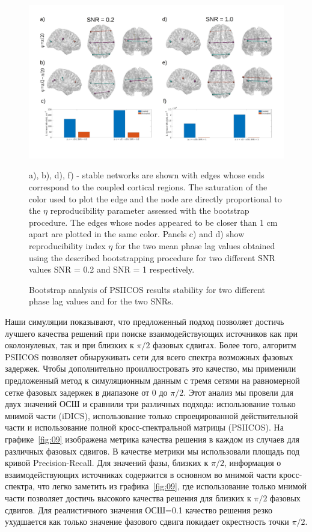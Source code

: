 \begin{figure}[!ht]
 \includegraphics[width=\textwidth]{../images/psiicos_paper/Figure8_hr.jpg}
 \caption{Bootstrap analysis of PSIICOS results stability for two different phase lag values and for the two SNRs.}
 a), b), d), f) - stable networks are shown with edges whose ends correspond to
 the coupled cortical regions. The saturation of the color used to plot the
 edge and the node are directly proportional to the $\eta$ reproducibility
 parameter assessed with the bootstrap procedure. The edges whose nodes
 appeared to be closer than 1 cm apart are plotted in the same color. Panels c)
 and d) show reproducibility index $\eta$ for the two mean phase lag values
 obtained using the described bootstrapping procedure for two different SNR
 values SNR = 0.2 and SNR = 1 respectively.
 \label{fig:08}

\end{figure}%


Наши симуляции показывают, что предложенный подход позволяет достичь лучшего
качества решений при поиске взаимодействующих источников как при околонулевых,
так и при близких к $\pi/2$ фазовых сдвигах. Более того, алгоритм PSIICOS
позволяет обнаруживать сети для всего спектра возможных фазовых задержек. Чтобы
дополнительно проиллюстровать это качество, мы применили предложенный метод к
симуляционным данным с тремя сетями на равномерной сетке фазовых задержек в
диапазоне от 0 до $\pi/2$. Этот анализ мы провели для двух значений ОСШ и
сравнили три различных подхода: использование только мнимой части (iDICS),
использование только спроецированной действительной части и использование
полной кросс-спектральной матрицы (PSIICOS). На графике~\ref{fig:09}
изображена метрика качества решения в каждом из случаев для различных фазовых
сдвигов.  В качестве метрики мы использовали площадь под кривой
Precision-Recall. Для значений фазы, близких к $\pi/2$, информация о взаимодействующих
источниках содержится в основном во мнимой части кросс-спектра, что легко
заметить из графика~\ref{fig:09}, где использование только мнимой части позволяет достичь
высокого качества решения для близких к $\pi/2$ фазовых сдвигов. Для реалистичного
значения ОСШ=0.1 качество решения резко ухудшается как только значение фазового сдвига
покидает окрестность точки $\pi/2$.

